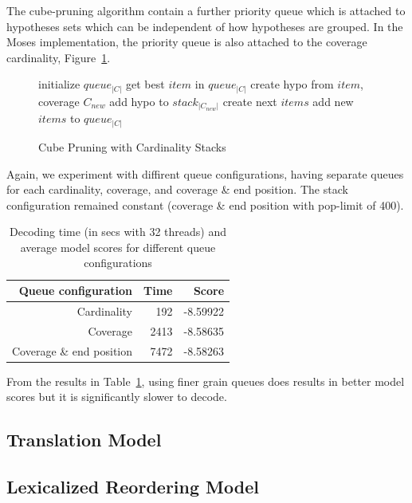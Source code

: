 \documentclass[11pt]{article}
\begin{document}
The cube-pruning algorithm contain a further priority queue which is attached to hypotheses sets which can be independent of how hypotheses are grouped. In the Moses implementation, the priority queue is also attached to the coverage cardinality, Figure~\ref{algo:Cube Pruning with Unsorted Stack}.
\begin{figure} [h]
\begin{algorithmic}
\STATE initialize $queue_{|C|}$
  \STATE get best $item$ in $queue_{|C|}$
  \STATE create hypo from $item$, coverage $C_{new}$
  \STATE add hypo to $stack_{|C_{new}|}$
  \STATE create next $items$
  \STATE add new $items$ to $queue_{|C|}$
\ENDFOR %
\end{algorithmic}
\caption{Cube Pruning with Cardinality Stacks}
\label{algo:Cube Pruning with Unsorted Stack}
\end{figure}
Again, we experiment with diffirent queue configurations, having separate queues for each cardinality, coverage, and coverage \& end position. The stack configuration remained constant (coverage \& end position with pop-limit of 400).
\begin{table}[h]
\small
\begin{center}
\begin{tabular}{|r|r|r|} \hline
Queue configuration		& Time		& Score \\ \hline
Cardinality			& 192		& -8.59922 \\
Coverage			& 2413		& -8.58635 \\
Coverage \& end position	& 7472		& -8.58263 \\ \hline
\end{tabular}
\end{center}
\caption{Decoding time (in secs with 32 threads) and average model scores for different queue configurations}
\label{tab:queue-configuration}
\end{table}
From the results in Table~\ref{tab:queue-configuration}, using finer grain queues does results in better model scores but it is significantly slower to decode.


\subsection{Translation Model}






\subsection{Lexicalized Reordering Model}
\end{document}
